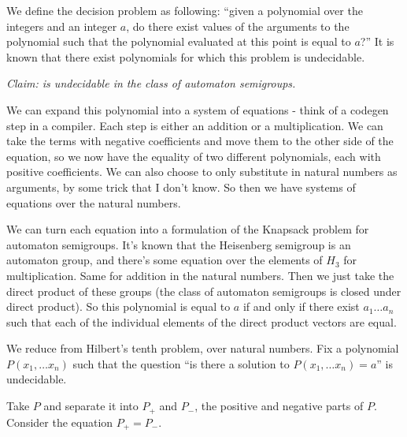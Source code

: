 \documentclass[11pt]{article}
\begin{document}
We define the decision problem  as following: ``given
a polynomial over the integers and an integer $a$, do there exist
values of the arguments to the polynomial such that the polynomial
evaluated at this point is equal to $a$?'' It is known that there
exist polynomials for which this problem is undecidable.

\textit{Claim:  is undecidable in the class of automaton semigroups.}

We can expand this polynomial into a system of equations - think of a
codegen step in a compiler. Each step is either an addition or a
multiplication. We can take the terms with negative coefficients and
move them to the other side of the equation, so we now have the
equality of two different polynomials, each with positive
coefficients. We can also choose to only substitute in natural numbers
as arguments, by some trick that I don't know. So then we have systems
of equations over the natural numbers.

We can turn each equation into a formulation of the Knapsack problem
for automaton semigroups. It's known that the Heisenberg semigroup is
an automaton group, and there's some equation over the elements of
$H_3$ for multiplication. Same for addition in the natural
numbers. Then we just take the direct product of these groups (the
class of automaton semigroups is closed under direct product). So this
polynomial is equal to $a$ if and only if there exist $a_1 \ldots a_n$
such that each of the individual elements of the direct product
vectors are equal.

We reduce from Hilbert's tenth problem, over natural numbers. Fix a polynomial $P(x_1, \ldots x_n)$ such that the question ``is there a solution to $P(x_1, \ldots x_n) = a$'' is undecidable.



Take $P$ and separate it into $P_+$ and $P_-$, the positive and negative parts of $P$. Consider the equation $P_+ = P_-$.
\end{document}
